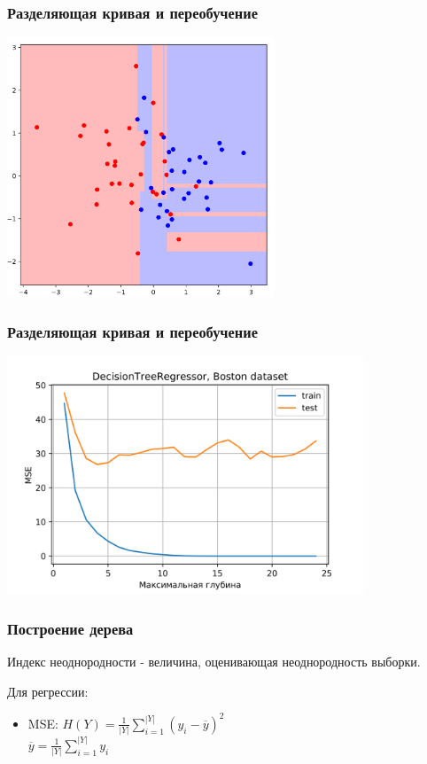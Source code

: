 \documentclass[14pt]{beamer}
\begin{document}
\begin{frame}
\frametitle{Разделяющая кривая и переобучение}
	\vspace{-1em}
    \begin{center}
        \includegraphics[width=0.6\textwidth]{tree_colormesh_1.png}
    \end{center}
\end{frame}

\begin{frame}
\frametitle{Разделяющая кривая и переобучение}
	\vspace{-1em}
    \begin{center}
        \includegraphics[width=0.8\textwidth]{tree_overfitting.png}
    \end{center}
\end{frame}

\begin{frame}
\frametitle{Построение дерева}
	\begin{rudef}
        Индекс неоднородности - величина, оценивающая неоднородность выборки.
    \end{rudef}
    
    Для регрессии:
    \begin {itemize}
		\item MSE: $H(Y) = \frac{1}{|Y|} \sum\limits_{i=1}^{|Y|} (y_i - \overline{y})^2$ \\
		 $\overline{y} = \frac{1}{|Y|} \sum\limits_{i=1}^{|Y|} y_i$
	  \end {itemize}
\end{frame}
\end{document}
